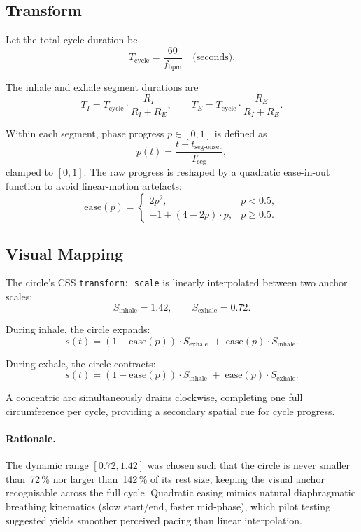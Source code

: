 \documentclass[11pt,a4paper]{article}
\begin{document}
\subsection{Transform}
Let the total cycle duration be
\[
T_{\text{cycle}} = \frac{60}{f_{\text{bpm}}} \quad\text{(seconds)}.
\]

The inhale and exhale segment durations are
\[
T_I = T_{\text{cycle}} \cdot \frac{R_I}{R_I + R_E}, \qquad
T_E = T_{\text{cycle}} \cdot \frac{R_E}{R_I + R_E}.
\]

Within each segment, phase progress $p \in [0,1]$ is defined as
\[
p(t) = \frac{t - t_{\text{seg-onset}}}{T_{\text{seg}}},
\]
clamped to $[0,1]$. The raw progress is reshaped by a quadratic ease-in-out
function to avoid linear-motion artefacts:
\[
\text{ease}(p) =
\begin{cases}
2p^2,                & p < 0.5, \\
-1 + (4 - 2p) \cdot p, & p \geq 0.5.
\end{cases}
\]

\subsection{Visual Mapping}
The circle's CSS \texttt{transform: scale} is linearly interpolated between
two anchor scales:
\[
S_{\text{inhale}} = 1.42, \qquad S_{\text{exhale}} = 0.72.
\]

During inhale, the circle expands:
\[
s(t) = (1 - \text{ease}(p)) \cdot S_{\text{exhale}} \;+\; \text{ease}(p) \cdot S_{\text{inhale}}.
\]

During exhale, the circle contracts:
\[
s(t) = (1 - \text{ease}(p)) \cdot S_{\text{inhale}} \;+\; \text{ease}(p) \cdot S_{\text{exhale}}.
\]

A concentric arc simultaneously drains clockwise, completing one full
circumference per cycle, providing a secondary spatial cue for cycle progress.

\paragraph{Rationale.}
The dynamic range $[0.72, 1.42]$ was chosen such that the circle is never
smaller than~72\,\% nor larger than~142\,\% of its rest size, keeping the
visual anchor recognisable across the full cycle. Quadratic easing mimics
natural diaphragmatic breathing kinematics (slow start/end, faster mid-phase),
which pilot testing suggested yields smoother perceived pacing than linear
interpolation.
\end{document}
